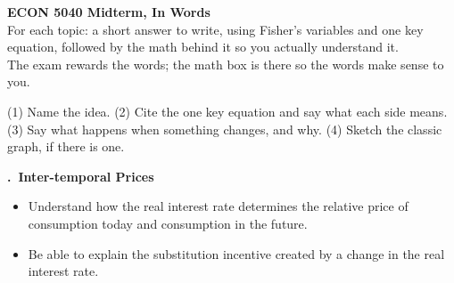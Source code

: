 \documentclass[11pt]{article}
\newcounter{qn}
\newcommand{\question}[1]{\par\needspace{14\baselineskip}\refstepcounter{qn}\medskip
{\bfseries\color{ink}\large \theqn.\ #1}\par\smallskip}
\begin{document}

\begin{center}
{\LARGE\bfseries\color{ink} ECON 5040 Midterm, In Words}\\[3pt]
{\small For each topic: a short answer to write, using Fisher's variables and one key equation, followed by the math behind it so you actually understand it.\\
The exam rewards the words; the math box is there so the words make sense to you.}
\end{center}

\begin{tcolorbox}[colback=warm,colframe=key,boxrule=0.6pt,arc=2pt,title={\bfseries\small The recipe for every answer},fonttitle=\small]
\small (1) Name the idea. (2) Cite the one key equation and say what each side means. (3) Say what happens when something changes, and why. (4) Sketch the classic graph, if there is one.
\end{tcolorbox}

\question{Inter-temporal Prices}
\begin{itemize}[leftmargin=1.2em,itemsep=0pt]\itshape
\item Understand how the real interest rate determines the relative price of consumption today and consumption in the future.
\item Be able to explain the substitution incentive created by a change in the real interest rate.
\end{itemize}
\end{document}
